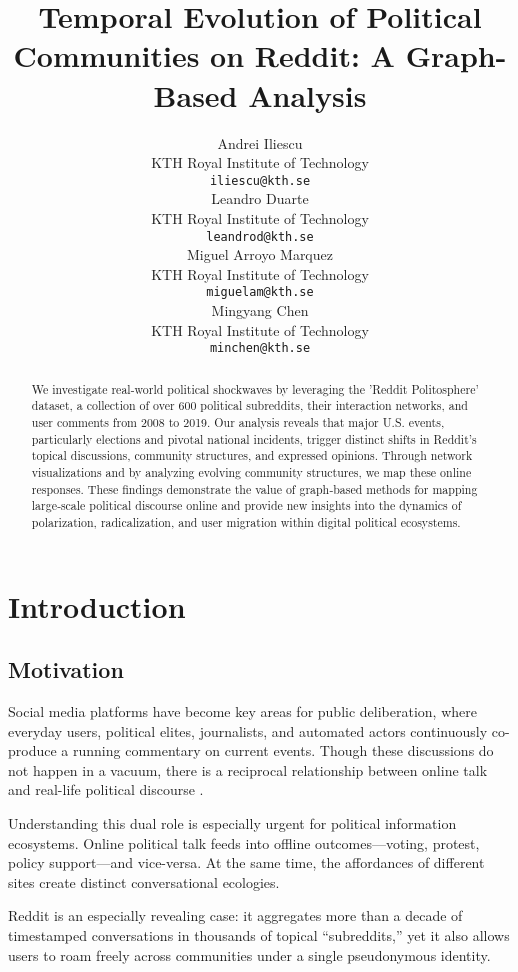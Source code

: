 \documentclass{article}
\title{Temporal Evolution of Political Communities on Reddit: A Graph-Based Analysis}
\author{
  Andrei Iliescu \\
  KTH Royal Institute of Technology\\
  \texttt{iliescu@kth.se} \\
  \And
  Leandro Duarte \\
  KTH Royal Institute of Technology\\
  \texttt{leandrod@kth.se} \\
  \And
  Miguel Arroyo Marquez \\
  KTH Royal Institute of Technology\\
  \texttt{miguelam@kth.se} \\
  \And
  Mingyang Chen \\
  KTH Royal Institute of Technology\\
  \texttt{minchen@kth.se} \\
}
\theoremstyle{definition}
\begin{document}
\maketitle

\begin{abstract}
 We investigate real-world political shockwaves by leveraging the 'Reddit Politosphere' dataset, a collection of over 600 political subreddits, their interaction networks, and user comments from 2008 to 2019. Our analysis reveals that major U.S. events, particularly elections and pivotal national incidents, trigger distinct shifts in Reddit's topical discussions, community structures, and expressed opinions. Through network visualizations and by analyzing evolving community structures, we map these online responses. These findings demonstrate the value of graph‐based methods for mapping large‐scale political discourse online and provide new insights into the dynamics of polarization, radicalization, and user migration within digital political ecosystems.
\end{abstract}


\section{Introduction}

\subsection{Motivation}

Social media platforms have become key areas for public deliberation, where everyday users, political elites, journalists, and automated actors continuously co-produce a running commentary on current events. Though these discussions do not happen in a vacuum, there is a reciprocal relationship between online talk and real-life political discourse \cite{effectnewsitaly}. 

Understanding this dual role is especially urgent for political information ecosystems. Online political talk feeds into offline outcomes—voting, protest, policy support—and vice-versa. At the same time, the affordances of different sites create distinct conversational ecologies.

Reddit is an especially revealing case: it aggregates more than a decade of timestamped conversations in thousands of topical “subreddits,” yet it also allows users to roam freely across communities under a single pseudonymous identity.
\end{document}
